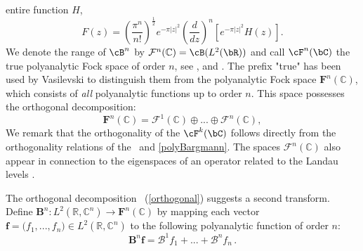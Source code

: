 \documentclass[12pt]{amsart}
\theoremstyle{plain}
\numberwithin{equation}{section}
\begin{document}
entire function $H$,\ 
\begin{equation*}
F(z)=\left( \frac{\pi ^{n}}{n!}\right) ^{\frac{1}{2}}e^{-\pi \left\vert
z\right\vert ^{2}}\left( \frac{d}{dz}\right) ^{n}\left[ e^{-\pi \left\vert
z\right\vert ^{2}}H(z)\right] \text{.}
\end{equation*}%
%
%
%
We denote the range of $\cB^{n}$ by $\mathcal{F}^{n}(%
\mathbb{C}
)=\cB(L^{2}(\bR))$ and call $\cF^{n}(\bC)$ the true polyanalytic Fock space
of order $n$, %
see \cite{Abreusampling}, \cite{Abreustructure} and \cite{VasiFock}. The
prefix "true" has been used by Vasilevski \cite{VasiFock} to distinguish
them from the polyanalytic Fock space $\mathbf{F}^{n}(%
\mathbb{C}
)$, which consists of \emph{all }polyanalytic functions up to order $n$.
This space possesses the orthogonal decomposition:%
\begin{equation}
\mathbf{F}^{n}(%
\mathbb{C}
)=\mathcal{F}^{1}(%
\mathbb{C}
)\oplus ...\oplus \mathcal{F}^{n}(%
\mathbb{C}
),  \label{orthogonal}
\end{equation}%
We remark that the orthogonality of the $\cF^{k}(\bC)$ follows directly from
the orthogonality relations of the \stft\ and \eqref{polyBargmann}. The
spaces $\mathcal{F}^{n}(%
\mathbb{C}
)$ also appear in connection to the eigenspaces of an operator related to
the Landau levels \cite{AAZ}.

The orthogonal decomposition ~(\ref{orthogonal}) suggests a second
transform. Define $\mathbf{B}^{n}:L^{2}(%
\mathbb{R}
,%
\mathbb{C}
^{n})\rightarrow \mathbf{F}^{n}(%
\mathbb{C}
)$ by mapping each vector $\mathbf{f=(}f_{1},...,f_{n}\mathbf{)}\in L^{2}(%
\mathbb{R}
,%
\mathbb{C}
^{n})$ to the following polyanalytic function of order $n$: 
\begin{equation}
\mathbf{B}^{n}\mathbf{f=}\mathcal{B}^{1}f_{1}+...+\mathcal{B}^{n}f_{n}\,.
\label{polyanalyticBargmann}
\end{equation}
\end{document}
